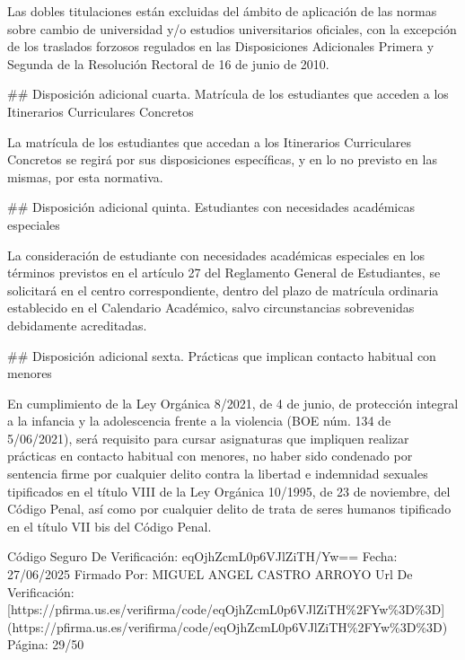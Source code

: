 \documentclass{article}
\begin{document}
\begin{itemize}
\begin{itemize}
\begin{scriptsize}
                  Las dobles titulaciones están excluidas del ámbito de aplicación de las normas sobre cambio de universidad y/o estudios universitarios oficiales, con la excepción de los traslados forzosos regulados en las Disposiciones Adicionales Primera y Segunda de la Resolución Rectoral de 16 de junio de 2010.

                  \#\# Disposición adicional cuarta. Matrícula de los estudiantes que acceden a los Itinerarios Curriculares Concretos

                  La matrícula de los estudiantes que accedan a los Itinerarios Curriculares Concretos se regirá por sus disposiciones específicas, y en lo no previsto en las mismas, por esta normativa.

                  \#\# Disposición adicional quinta. Estudiantes con necesidades académicas especiales

                  La consideración de estudiante con necesidades académicas especiales en los términos previstos en el artículo 27 del Reglamento General de Estudiantes, se solicitará en el centro correspondiente, dentro del plazo de matrícula ordinaria establecido en el Calendario Académico, salvo circunstancias sobrevenidas debidamente acreditadas.

                  \#\# Disposición adicional sexta. Prácticas que implican contacto habitual con menores

                  En cumplimiento de la Ley Orgánica 8/2021, de 4 de junio, de protección integral a la infancia y la adolescencia frente a la violencia (BOE núm. 134 de 5/06/2021), será requisito para cursar asignaturas que impliquen realizar prácticas en contacto habitual con menores, no haber sido condenado por sentencia firme por cualquier delito contra la libertad e indemnidad sexuales tipificados en el título VIII de la Ley Orgánica 10/1995, de 23 de noviembre, del Código Penal, así como por cualquier delito de trata de seres humanos tipificado en el título VII bis del Código Penal.

                  Código Seguro De Verificación: eqOjhZcmL0p6VJlZiTH/Yw==
                  Fecha: 27/06/2025
                  Firmado Por: MIGUEL ANGEL CASTRO ARROYO
                  Url De Verificación: [https://pfirma.us.es/verifirma/code/eqOjhZcmL0p6VJlZiTH\%2FYw\%3D\%3D](https://pfirma.us.es/verifirma/code/eqOjhZcmL0p6VJlZiTH\%2FYw\%3D\%3D)
                  Página: 29/50
                \end{scriptsize}
        \end{itemize}



\end{itemize}
\end{document}
